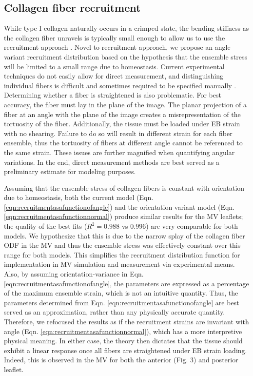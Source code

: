     
    
    
\subsection{Collagen fiber recruitment}

    While type I collagen naturally occurs in a crimped state, the bending stiffness as the collagen fiber unravels is typically small enough to allow us to use the recruitment approach \cite{lanir_constitutive_1983}\cite{fata_insights_2014}\cite{sacks_incorporation_2003}\cite{lanir_structural_1979}\cite{kastelic_structural_1980}\cite{hansen_recruitment_2002}\cite{cacho_constitutive_2007}\cite{grytz_constitutive_2009}. Novel to recruitment approach, we propose an angle variant recruitment distribution based on the hypothesis that the ensemble stress will be limited to a small range due to homeostasis. Current experimental techniques do not easily allow for direct measurement, and distinguishing individual fibers is difficult and sometimes required to be specified manually \cite{hill_theoretical_2012}. Determining whether a fiber is straightened is also problematic. For best accuracy, the fiber must lay in the plane of the image. The planar projection of a fiber at an angle with the plane of the image creates a misrepresentation of the tortuosity of the fiber. Additionally, the tissue must be loaded under EB strain with no shearing. Failure to do so will result in different strain for each fiber ensemble, thus the tortuosity of fibers at different angle cannot be referenced to the same strain. These issues are further magnified when quantifying angular variations. In the end, direct measurement methods are best served as a preliminary estimate for modeling purposes.


    Assuming that the ensemble stress of collagen fibers is constant with orientation due to homeostasis, both the current model (Eqn. \ref{eqn:recruitmentasafunctionofangle}) and the orientation-variant model (Eqn. \ref{eqn:recruitmentasafunctionnormal}) produce similar results for the MV leaflets; the quality of the best fits ($R^2 = 0.988$ vs $0.996$) are very comparable for both models. We hypothesize that this is due to the narrow splay of the collagen fiber ODF in the MV and thus the ensemble stress was effectively constant over this range for both models. This simplifies the recruitment distribution function for implementation in MV simulation and measurement via experimental means. Also, by assuming orientation-variance in Eqn. \ref{eqn:recruitmentasafunctionofangle}, the parameters are expressed as a percentage of the maximum ensemble strain, which is not an intuitive quantity. Thus, the parameters determined from Eqn. \ref{eqn:recruitmentasafunctionofangle} are best served as an approximation, rather than any physically accurate quantity. Therefore, we refocused the results as if the recruitment strains are invariant with angle (Eqn. \ref{eqn:recruitmentasafunctionnormal}), which has a more interpretive physical meaning. In either case, the theory then dictates that the tissue should exhibit a linear response once all fibers are straightened under EB strain loading. Indeed, this is observed in the MV for both the anterior (Fig. 3) and posterior leaflet.


